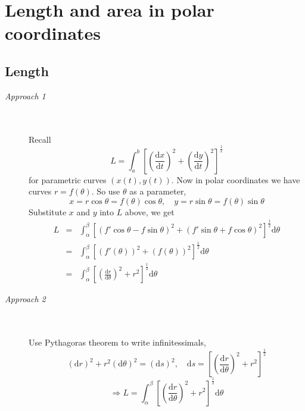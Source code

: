 \documentclass[12pt]{report}
\theoremstyle{definition}
\begin{document}
\section{Length and area in polar coordinates}
\subsection{Length}
\begin{description}
    \item[\textit{Approach 1}] \,
            \\\\Recall\[
                L = \int_a^{b} {\left[{\left(\frac{\mathrm{d} x}{\mathrm{d}t} \right)}^{2}
                + {\left(\frac{\mathrm{d} y}{\mathrm{d}t} \right)}^{2}\right]}^{\frac{1}{2}}
            \]for parametric curves $(x(t),y(t))$.
            Now in polar coordinates we have curves $r = f(\theta)$. So use $\theta$ as a parameter,\[
                x = r\cos{\theta} = f(\theta)\cos{\theta}, \quad y = r\sin{\theta} = f(\theta)\sin{\theta}
            \]Substitute $x$ and $y$ into $L$ above, we get
            \begin{eqnarray*}
                L &=& \int_{\alpha}^{\beta} {\left[{(f'\cos{\theta}-f\sin{\theta})}^{2} 
                  + {(f'\sin{\theta}+f\cos{\theta})}^{2}\right]}^{\frac{1}{2}}\mathrm{d} \theta \\
                  &=& \int_\alpha ^{\beta} {\left[{\left(f'(\theta)\right)}^{2} 
                  + {\left(f(\theta)\right)}^{2}\right]}^{\frac{1}{2}} \mathrm{d}\theta \\
                  &=& \int_\alpha ^{\beta} {\left[{\left(\frac{\mathrm{d} r}{\mathrm{d}\theta} \right)}^{2} 
                  + r^{2}\right]}^{\frac{1}{2}}\mathrm{d}\theta
            \end{eqnarray*}
        \item[\textit{Approach 2}] \,
            \\\\Use Pythagoras theorem to write infinitessimals,\[
                {(\mathrm{d}r)}^{2} + r^{2}{(\mathrm{d}\theta)}^{2} = {(\mathrm{d}s)}^{2},
                \quad
                \mathrm{d}s = {\left[{\left(\frac{\mathrm{d}r}{\mathrm{d}\theta}\right)}^{2} + r^{2}\right]}^{\frac{1}{2}}
            \]\[
            \Rightarrow L = \int_\alpha ^{\beta} {\left[{\left(\frac{\mathrm{d}r}{\mathrm{d}\theta}\right)}^{2} 
            + r^{2}\right]}^{\frac{1}{2}} \mathrm{d}\theta
            \]
\end{description}
\end{document}
